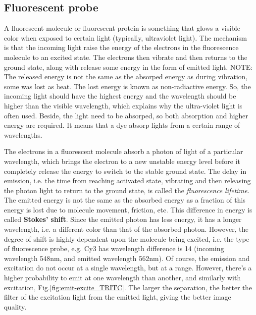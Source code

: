 \subsection{Fluorescent probe	}

\begin{framed}  

  A fluorescent molecule or fluorescent protein  is something that glows a
  visible color when exposed to certain light (typically, ultraviolet light).
  The mechanism is that the incoming light raise the energy of the electrons in
  the fluorescence molecule to an excited state. The electrons then vibrate and
  then returns to the ground state, along with release some energy in the form
  of emitted light. NOTE: The released energy is not the same as the absorped
  energy as during vibration, some was lost as heat. The lost energy is known as
  non-radiactive energy. So, the incoming light should have the highest energy
  and the wavelength should be higher than the visible wavelength, which
  explains why the ultra-violet light is often used. Beside, the light need to
  be absorped, so both absorption and higher energy are required. It means that
  a dye absorp lights from a certain range of wavelengths.
\end{framed}  

The electrons in a fluorescent molecule absorb a photon of light of a particular
wavelength, which brings the electron to a new unstable energy level before it
completely release the energy to switch to the stable ground state.
The delay in emission, i.e. the time from reaching activated state, vibrating
and then releasing the photon light to return to the ground state, is called the
{\it fluorescence lifetime}. The emitted energy is not the same as the absorbed
energy as a fraction of this energy is lost due to molecule movement, friction,
etc. This difference in energy is called {\bf Stokes' shift}. Since the emitted
photon has less energy, it has a longer wavelength, i.e. a different color than
that of the absorbed photon.
However, the degree of shift is highly dependent upon the molecule being
excited, i.e. the type of fluorescence probe, e.g. Cy3 has wavelength difference
is 14 (incoming wavelength 548nm, and emitted wavelength 562nm). Of course, the
emission and excitation do not occur at a single wavelength, but at a range.
However, there's a higher probability to emit at one wavelength than another,
and similarly with excitation, Fig.\ref{fig:emit-excite_TRITC}. The larger the
separation, the better the filter of the excitation light from the emitted
light, giving the better image quality.

